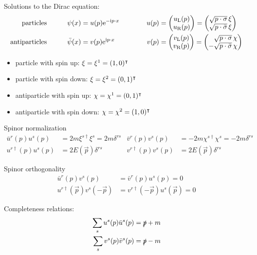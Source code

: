 			\noindent
			Solutions to the Dirac equation:
			\begin{align}
				\text{particles}
				& \hsp
				\psi(x) = u(p) \ex^{-\i p \cdot x}
				& \hsp
				u(p) &= \mqty(
				u_\text{L}(p) \\
				u_\text{R}(p)
				) = \mqty(
				\sqrt{p\cdot\sigma}\,\xi \\
				\sqrt{p\cdot\bar{\sigma}}\,\xi
				) \\
				\text{antiparticles}
				& \hsp
				\bar{\psi}(x) = v(p) \ex^{\i p \cdot x}
				& \hsp
				v(p) &= \mqty(
				v_\text{L}(p) \\
				v_\text{R}(p)
				) = \mqty(
				\M\sqrt{p\cdot\sigma}\,\chi \\
				-\sqrt{p\cdot\bar{\sigma}}\,\chi
				)
			\end{align}
			\begin{itemize} \itemsep -0pt
				\item particle with spin up: $\xi=\xi^1 = (1, 0)^\intercal$
				\item particle with spin down: $\xi=\xi^2 = (0, 1)^\intercal$
				\item antiparticle with spin up: $\chi=\chi^1 = (0, 1)^\intercal$
				\item antiparticle with spin down: $\chi=\chi^2 = (1, 0)^\intercal$
			\end{itemize}

			\noindent
			Spinor normalization
			\begin{align}
				\bar{u}^r(p) u^s(p) &= 2m \xi^{s\dagger} \xi^s = 2m \delta^{rs}
				&
				\bar{v}^r(p) v^s(p) &= - 2m\chi^{s\dagger}\chi^s = - 2m\delta^{rs} \\
				u^{r\dagger}(p) u^s(p) &= 2E(\vec{p}) \delta^{rs}
				&
				v^{r\dagger}(p) v^s(p) &= 2E(\vec{p}) \delta^{rs}
			\end{align}

			\noindent
			Spinor orthogonality
			\begin{align}
				\bar{u}^r(p) v^s(p) &= \bar{v}^r(p) u^s(p) = 0 \\
				u^{r \dagger}(\vec{p}) v^s(-\vec{p}) &= v^{r \dagger}(-\vec{p}) u^s(\vec{p}) = 0
			\end{align}

			\noindent
			Completeness relations:
			\begin{equation}
				\begin{aligned}
					\sum_s u^s(p) \bar{u}^s(p) &= \slashed{p} + m \\
					\sum_s v^s(p) \bar{v}^s(p) &= \slashed{p} - m
				\end{aligned}
			\end{equation}

